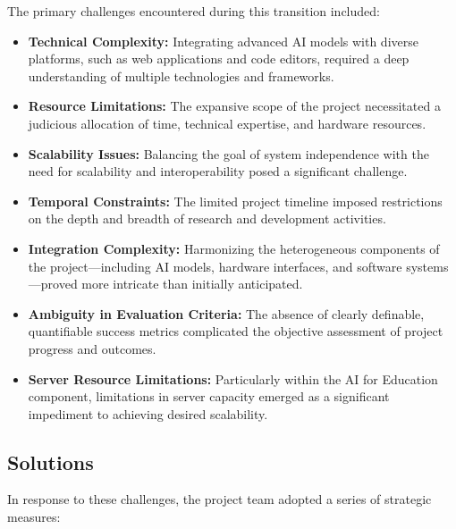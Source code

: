 The primary challenges encountered during this transition included:

\begin{itemize}
    \item \textbf{Technical Complexity:} Integrating advanced AI models with diverse platforms, such as web applications and code editors, required a deep understanding of multiple technologies and frameworks.
    \item \textbf{Resource Limitations:} The expansive scope of the project necessitated a judicious allocation of time, technical expertise, and hardware resources.
    \item \textbf{Scalability Issues:} Balancing the goal of system independence with the need for scalability and interoperability posed a significant challenge.
    \item \textbf{Temporal Constraints:} The limited project timeline imposed restrictions on the depth and breadth of research and development activities.
    \item \textbf{Integration Complexity:} Harmonizing the heterogeneous components of the project—including AI models, hardware interfaces, and software systems—proved more intricate than initially anticipated.
    \item \textbf{Ambiguity in Evaluation Criteria:} The absence of clearly definable, quantifiable success metrics complicated the objective assessment of project progress and outcomes.
    \item \textbf{Server Resource Limitations:} Particularly within the AI for Education component, limitations in server capacity emerged as a significant impediment to achieving desired scalability.
\end{itemize}

\subsection{Solutions}

In response to these challenges, the project team adopted a series of strategic measures:

